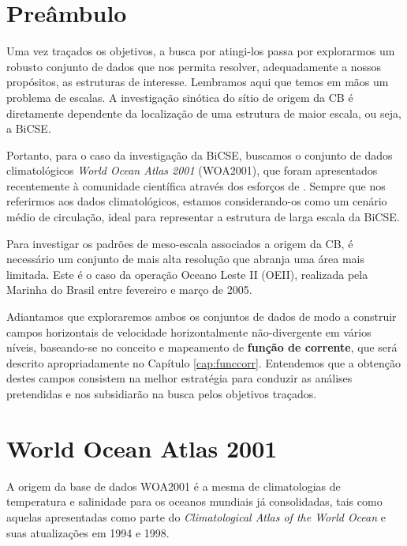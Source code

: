 \section{Preâmbulo}\label{sec:pre_dados}

\hspace{6mm} Uma vez traçados os objetivos, a busca por atingi-los passa por explorarmos 
um robusto conjunto de dados que nos permita resolver, adequadamente a nossos propósitos, 
as estruturas de interesse. Lembramos aqui que temos em mãos um problema de escalas. 
A investigação sinótica do sítio de origem da CB é diretamente dependente
da localização de uma estrutura de maior escala, ou seja, a BiCSE.

Portanto, para o caso da investigação da BiCSE, buscamos o conjunto de dados climatológicos 
{\it World Ocean Atlas 2001} (WOA2001), que foram apresentados recentemente à comunidade científica através
dos esforços de \cite{boyer_etal2005}. Sempre que nos referirmos aos dados climatológicos, estamos 
considerando-os como um cenário médio de circulação, ideal para representar a estrutura de larga escala
da BiCSE. 

Para investigar os padrões de meso-escala associados a origem da CB, é necessário um conjunto de mais alta 
resolução que abranja uma área mais limitada. Este é o caso da operação Oceano Leste II (OEII),
realizada pela Marinha do Brasil entre fevereiro e março de 2005.

Adiantamos que exploraremos ambos os conjuntos de dados de modo a construir campos horizontais de velocidade
horizontalmente não-divergente em vários níveis, 
baseando-se no conceito e mapeamento de {\bf função de corrente}, que será descrito apropriadamente no Capítulo 
\ref{cap:funccorr}. Entendemos que a obtenção destes campos consistem na melhor estratégia para conduzir as análises
pretendidas e nos subsidiarão na busca pelos objetivos traçados. 

\section{World Ocean Atlas 2001}\label{sec:woa2001}

\hspace{6mm} A origem da base de dados WOA2001 é a mesma de climatologias 
de temperatura e salinidade para os oceanos mundiais já consolidadas, tais como aquelas 
apresentadas como parte do \textsl{Climatological Atlas of the World Ocean} \citep{levitus1982} 
e suas atualizações em 1994 e 1998.

